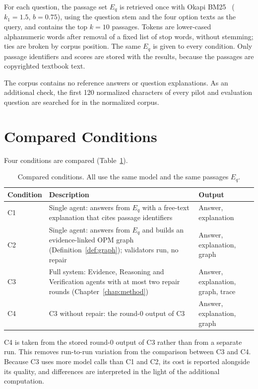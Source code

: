 For each question, the passage set $E_q$ is retrieved once with Okapi BM25~\cite{robertson_bm25_2009} ($k_1 = 1.5$, $b = 0.75$), using the question stem and the four option texts as the query, and contains the top $k = 10$ passages. Tokens are lower-cased alphanumeric words after removal of a fixed list of stop words, without stemming; ties are broken by corpus position. The same $E_q$ is given to every condition. Only passage identifiers and scores are stored with the results, because the passages are copyrighted textbook text.

The corpus contains no reference answers or question explanations. As an additional check, the first 120 normalized characters of every pilot and evaluation question are searched for in the normalized corpus. 

\section{Compared Conditions}
\label{sec:conditions}

Four conditions are compared (Table~\ref{tab:conditions}).

\begin{table}[H]
\centering
\caption{Compared conditions. All use the same model and the same passages $E_q$.}
\label{tab:conditions}
\small
\begin{tabularx}{\linewidth}{l >{\raggedright\arraybackslash}X >{\raggedright\arraybackslash}X}
\toprule
Condition & Description & Output \\
\midrule
C1 & Single agent: answers from $E_q$ with a free-text explanation that cites passage identifiers & Answer, explanation \\
C2 & Single agent: answers from $E_q$ and builds an evidence-linked OPM graph (Definition~\ref{def:graph}); validators run, no repair & Answer, explanation, graph \\
C3 & Full system: Evidence, Reasoning and Verification agents with at most two repair rounds (Chapter~\ref{chap:method}) & Answer, explanation, graph, trace \\
C4 & C3 without repair: the round-0 output of C3 & Answer, explanation, graph \\
\bottomrule
\end{tabularx}
\end{table}

C4 is taken from the stored round-0 output of C3 rather than from a separate run. This removes run-to-run variation from the comparison between C3 and C4. Because C3 uses more model calls than C1 and C2, its cost is reported alongside its quality, and differences are interpreted in the light of the additional computation.

